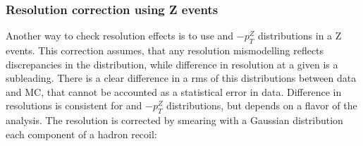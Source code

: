 \subsubsection{Resolution correction using Z events}
Another way to check resolution effects is to use \uperp and \upar  $ - p_T^{Z}$ distributions in a Z events. This correction assumes, that any resolution mismodelling reflects discrepancies in the \sumet distribution, while difference in resolution at a given \sumet is a subleading. There is a clear difference in a rms of this distributions between data and MC, that cannot be accounted as a statistical error in data. Difference in resolutions is consistent for \uperp and \upar $- p_T^{Z}$ distributions, but depends on a flavor of the analysis.  The resolution is corrected by smearing with a Gaussian distribution each component of a hadron recoil:

\begin{figure}[!tbp]
\begin{minipage}[h]{0.40\linewidth}
\end{minipage}
\hfill
\begin{minipage}[h]{0.40\linewidth}
\end{minipage}
\vfill
\begin{minipage}[h]{0.40\linewidth}
\end{minipage}
\hfill
\begin{minipage}[h]{0.40\linewidth}
\end{minipage}
\vfill
\begin{minipage}[h]{0.40\linewidth}
\end{minipage}
\hfill
\begin{minipage}[h]{0.40\linewidth}
\end{minipage}
\caption{}
\label{HadrRecoil:CorrSumet}
\end{figure}

